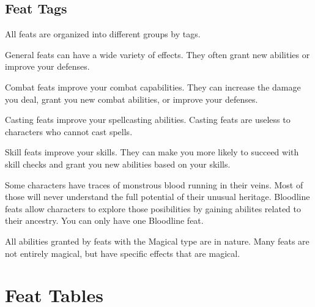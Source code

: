     \subsection{Feat Tags}
        All feats are organized into different groups by tags.

         General feats can have a wide variety of effects.
        They often grant new abilities or improve your defenses.

         Combat feats improve your combat capabilities.
        They can increase the damage you deal, grant you new combat abilities, or improve your defenses.

         Casting feats improve your spellcasting abilities.
        Casting feats are useless to characters who cannot cast spells.

         Skill feats improve your skills.
        They can make you more likely to succeed with skill checks and grant you new abilities based on your skills.

         Some characters have traces of monstrous blood running in their veins.
        Most of those will never understand the full potential of their unusual heritage.
        Bloodline feats allow characters to explore those posibilities by gaining abilites related to their ancestry.
        You can only have one Bloodline feat.

        All abilities granted by feats with the Magical type are  in nature.
        Many feats are not entirely magical, but have specific effects that are magical.

\section{Feat Tables}

